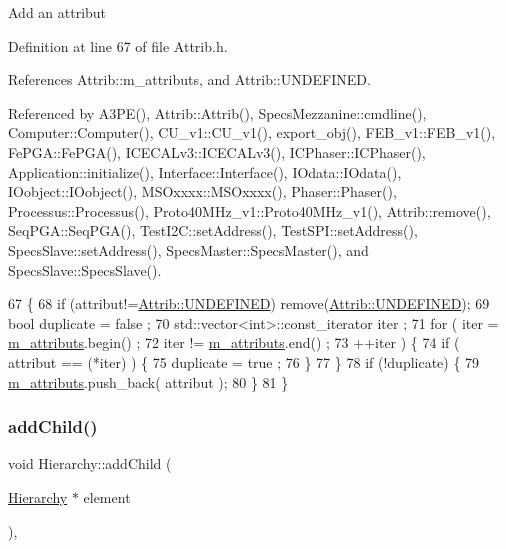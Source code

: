 Add an attribut 

Definition at line 67 of file Attrib.\+h.



References Attrib\+::m\+\_\+attributs, and Attrib\+::\+U\+N\+D\+E\+F\+I\+N\+ED.



Referenced by A3\+P\+E(), Attrib\+::\+Attrib(), Specs\+Mezzanine\+::cmdline(), Computer\+::\+Computer(), C\+U\+\_\+v1\+::\+C\+U\+\_\+v1(), export\+\_\+obj(), F\+E\+B\+\_\+v1\+::\+F\+E\+B\+\_\+v1(), Fe\+P\+G\+A\+::\+Fe\+P\+G\+A(), I\+C\+E\+C\+A\+Lv3\+::\+I\+C\+E\+C\+A\+Lv3(), I\+C\+Phaser\+::\+I\+C\+Phaser(), Application\+::initialize(), Interface\+::\+Interface(), I\+Odata\+::\+I\+Odata(), I\+Oobject\+::\+I\+Oobject(), M\+S\+Oxxxx\+::\+M\+S\+Oxxxx(), Phaser\+::\+Phaser(), Processus\+::\+Processus(), Proto40\+M\+Hz\+\_\+v1\+::\+Proto40\+M\+Hz\+\_\+v1(), Attrib\+::remove(), Seq\+P\+G\+A\+::\+Seq\+P\+G\+A(), Test\+I2\+C\+::set\+Address(), Test\+S\+P\+I\+::set\+Address(), Specs\+Slave\+::set\+Address(), Specs\+Master\+::\+Specs\+Master(), and Specs\+Slave\+::\+Specs\+Slave().


\begin{DoxyCode}
67                             \{
68     \textcolor{keywordflow}{if} (attribut!=\hyperlink{classAttrib_a69e171d7cc6417835a5a306d3c764235a3a8da2ab97dda18aebab196fe4100531}{Attrib::UNDEFINED}) \textcolor{keyword}{remove}(\hyperlink{classAttrib_a69e171d7cc6417835a5a306d3c764235a3a8da2ab97dda18aebab196fe4100531}{Attrib::UNDEFINED});
69     \textcolor{keywordtype}{bool} duplicate = false ;
70     std::vector<int>::const\_iterator iter ;
71     \textcolor{keywordflow}{for} ( iter  = \hyperlink{classAttrib_ac4bd58a0cc6b38a3b711d609a3d3aacc}{m\_attributs}.begin() ;
72           iter != \hyperlink{classAttrib_ac4bd58a0cc6b38a3b711d609a3d3aacc}{m\_attributs}.end()   ;
73           ++iter ) \{
74       \textcolor{keywordflow}{if} ( attribut == (*iter) ) \{
75         duplicate = true ;
76       \}
77     \}
78     \textcolor{keywordflow}{if} (!duplicate) \{
79       \hyperlink{classAttrib_ac4bd58a0cc6b38a3b711d609a3d3aacc}{m\_attributs}.push\_back( attribut );
80     \}
81   \}
\end{DoxyCode}
\mbox{\label{classHierarchy_ad677774ff38fcb257c04a3a10d471fac}} 
\subsubsection{\texorpdfstring{add\+Child()}{addChild()}}
{\footnotesize\ttfamily void Hierarchy\+::add\+Child (\begin{DoxyParamCaption}\item[{\hyperlink{classHierarchy}{Hierarchy} $\ast$}]{element }\end{DoxyParamCaption})\hspace{0.3cm}{\ttfamily [virtual]}, {\ttfamily [inherited]}}



